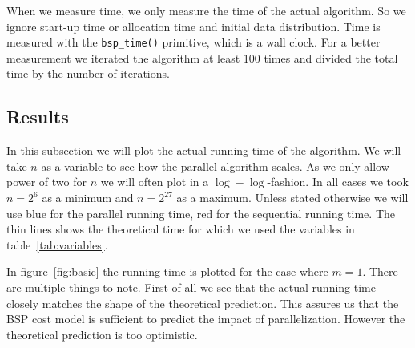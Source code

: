 When we measure time, we only measure the time of the actual algorithm. So we ignore start-up time or allocation time and initial data distribution. Time is measured with the \texttt{bsp\_time()} primitive, which is a wall clock. For a better measurement we iterated the algorithm at least 100 times and divided the total time by the number of iterations.

\subsection{Results}
In this subsection we will plot the actual running time of the algorithm. We will take $n$ as a variable to see how the parallel algorithm scales. As we only allow power of two for $n$ we will often plot in a $\log-\log$-fashion. In all cases we took $n=2^6$ as a minimum and $n=2^27$ as a maximum. Unless stated otherwise we will use blue for the parallel running time, red for the sequential running time. The thin lines shows the theoretical time for which we used the variables in table~\ref{tab:variables}.

In figure~\ref{fig:basic} the running time is plotted for the case where $m=1$. There are multiple things to note. First of all we see that the actual running time closely matches the shape of the theoretical prediction. This assures us that the BSP cost model is sufficient to predict the impact of parallelization. However the theoretical prediction is too optimistic.

